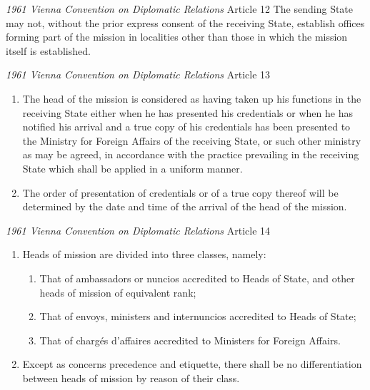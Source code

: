 \begin{conventiondetails}{\textit{1961 Vienna Convention on Diplomatic Relations} Article 12}
    \flushleft
    The sending State may not, without the prior express consent of the receiving State, establish offices forming part of the mission in localities other than those in which the mission itself is established.
\end{conventiondetails}

\begin{conventiondetails}{\textit{1961 Vienna Convention on Diplomatic Relations} Article 13}
    \flushleft
    \begin{enumerate}
        \item The head of the mission is considered as having taken up his functions in the receiving State either when he has presented his credentials or when he has notified his arrival and a true copy of his credentials has been presented to the Ministry for Foreign Affairs of the receiving State, or such other ministry as may be agreed, in accordance with the practice prevailing in the receiving State which shall be applied in a uniform manner.
        \item The order of presentation of credentials or of a true copy thereof will be determined by the date and time of the arrival of the head of the mission.
    \end{enumerate}
\end{conventiondetails}

\begin{conventiondetails}{\textit{1961 Vienna Convention on Diplomatic Relations} Article 14}
    \flushleft
    \begin{enumerate}
        \item Heads of mission are divided into three classes, namely:
        \begin{enumerate}
            \item That of ambassadors or nuncios accredited to Heads of State, and other heads of mission of equivalent rank;
            \item That of envoys, ministers and internuncios accredited to Heads of State;
            \item That of chargés d'affaires accredited to Ministers for Foreign Affairs.
        \end{enumerate}
        \item Except as concerns precedence and etiquette, there shall be no differentiation between heads of mission by reason of their class.
    \end{enumerate}
\end{conventiondetails}

